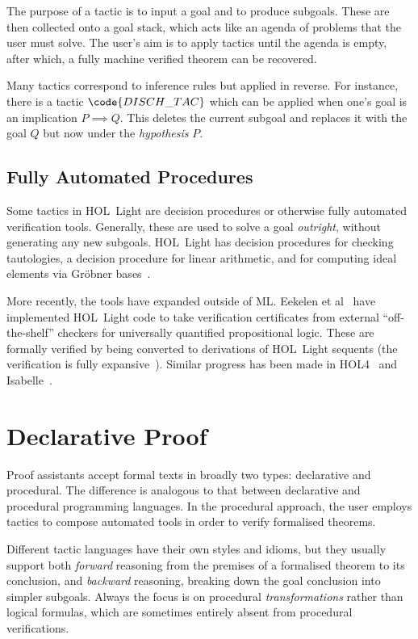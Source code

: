 The purpose of a tactic is to input a goal and to produce subgoals. These are then collected onto a goal stack, which acts like an agenda of problems that the user must solve. The user's aim is to apply tactics until the agenda is empty, after which, a fully machine verified theorem can be recovered.

Many tactics correspond to inference rules but applied in reverse. For instance, there is a tactic $\code{DISCH\_TAC}$ which can be applied when one's goal is an implication $P \implies Q$. This deletes the current subgoal and replaces it with the goal $Q$ but now under the \emph{hypothesis} $P$.

\subsection{Fully Automated Procedures}
Some tactics in HOL~Light are decision procedures or otherwise fully automated verification tools. Generally, these are used to solve a goal \emph{outright}, without generating any new subgoals. HOL~Light has decision procedures for checking tautologies, a decision procedure for linear arithmetic, and for computing ideal elements via Gr\"{o}bner bases~\cite{BuchbergerGrobner}.

More recently, the tools have expanded outside of ML. Eekelen et al~\cite{HOLLightBoolean} have implemented HOL~Light code to take verification certificates from external ``off-the-shelf'' checkers for universally quantified propositional logic. These are formally verified by being converted to derivations of HOL~Light sequents (the verification is fully expansive~\cite{FullyExpansive}). Similar progress has been made in HOL4~\cite{HOLBoolean} and Isabelle~\cite{IsabelleSledgehammer}.

\section{Declarative Proof}\label{sec:DeclarativeProof}
Proof assistants accept formal texts in broadly two types: declarative and procedural. The difference is analogous to that between declarative and procedural programming languages. In the procedural approach, the user employs tactics to compose automated tools in order to verify formalised theorems.

Different tactic languages have their own styles and idioms, but they usually support both \emph{forward} reasoning from the premises of a formalised theorem to its conclusion, and \emph{backward} reasoning, breaking down the goal conclusion into simpler subgoals. Always the focus is on procedural \emph{transformations} rather than logical formulas, which are sometimes entirely absent from procedural verifications.

